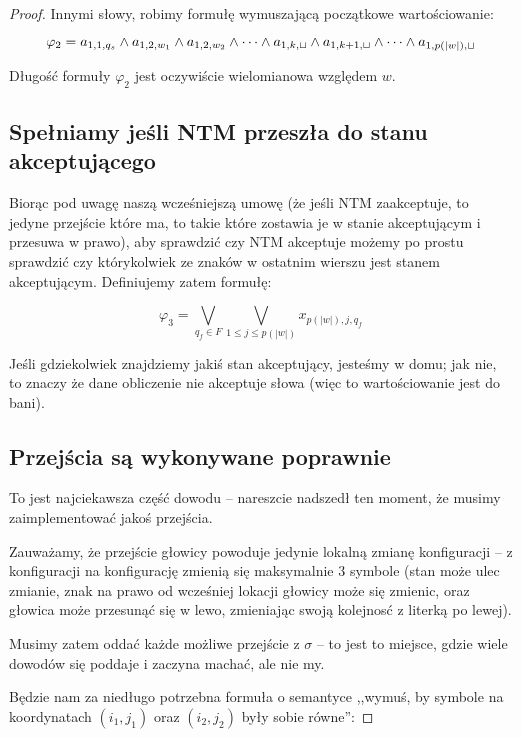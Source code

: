 \begin{proof}
        Innymi słowy, robimy formułę wymuszającą początkowe wartościowanie:
        
        \[
            \varphi_2 = a_{1,1, q_{s}} \land a_{1,2, w_1} \land a_{1,2, w_2} \land \dots \land a_{1, k, \sqcup} \land a_{1, k+1, \sqcup} \land \dots \land a_{1, p(|w|), \sqcup}
        \]
    
        Długość formuły \(\varphi_2\) jest oczywiście wielomianowa względem \(w\). 
    
    \subsection{Spełniamy jeśli NTM przeszła do stanu akceptującego}
        Biorąc pod uwagę naszą wcześniejszą umowę (że jeśli NTM zaakceptuje, to jedyne przejście które ma, to takie które zostawia je w stanie akceptującym i przesuwa w prawo), aby sprawdzić czy NTM akceptuje możemy po prostu sprawdzić czy którykolwiek ze znaków w ostatnim wierszu jest stanem akceptującym. Definiujemy zatem formułę:
        
        \[ 
            \varphi_3 = \bigvee_{q_f \in F } \bigvee_{1 \leq j \leq p(|w|)} x_{p(|w|), j, q_f}
        \]
        
        Jeśli gdziekolwiek znajdziemy jakiś stan akceptujący, jesteśmy w domu; jak nie, to znaczy że dane obliczenie nie akceptuje słowa (więc to wartościowanie jest do bani).
    
    \subsection{Przejścia są wykonywane poprawnie}
        To jest najciekawsza część dowodu -- nareszcie nadszedł ten moment, że musimy zaimplementować jakoś przejścia. 
        
        Zauważamy, że przejście głowicy powoduje jedynie lokalną zmianę konfiguracji -- z konfiguracji na konfigurację zmienią się maksymalnie 3 symbole (stan może ulec zmianie, znak na prawo od wcześniej lokacji głowicy może się zmienic, oraz głowica może przesunąć się w lewo, zmieniając swoją kolejnosć z literką po lewej).

        Musimy zatem oddać każde możliwe przejście z \( \sigma \) -- to jest to miejsce, gdzie wiele dowodów się poddaje i zaczyna machać, ale nie my. 
        
        Będzie nam za niedługo potrzebna formuła o semantyce ,,wymuś, by symbole na koordynatach \( (i_1, j_1) \) oraz \((i_2, j_2)\) były sobie równe'':
        

\end{proof}
